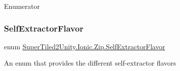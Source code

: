 \begin{DoxyEnumFields}{Enumerator}
\hline

\end{DoxyEnumFields}
\mbox{\label{namespace_super_tiled2_unity_1_1_ionic_1_1_zip_aa52d746f0c73d4f07fe6b2d188979963}} 
\subsubsection{\texorpdfstring{Self\+Extractor\+Flavor}{SelfExtractorFlavor}}
{\footnotesize\ttfamily enum \mbox{\hyperlink{namespace_super_tiled2_unity_1_1_ionic_1_1_zip_aa52d746f0c73d4f07fe6b2d188979963}{Super\+Tiled2\+Unity.\+Ionic.\+Zip.\+Self\+Extractor\+Flavor}}\hspace{0.3cm}{\ttfamily [strong]}}



An enum that provides the different self-\/extractor flavors 

